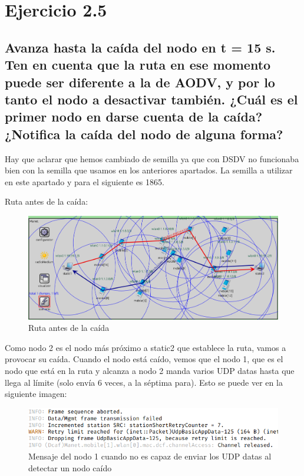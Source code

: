 \section{Ejercicio 2.5}

\subsection{Avanza hasta la caída del nodo en t = 15 s. Ten en cuenta que la ruta en ese momento puede ser diferente a
la de AODV, y por lo tanto el nodo a desactivar también. ¿Cuál es el primer nodo en darse cuenta de la caída?
¿Notifica la caída del nodo de alguna forma?}

Hay que aclarar que hemos cambiado de semilla ya que con DSDV no funcionaba bien con la semilla que usamos en los anteriores apartados. La semilla a utilizar en este apartado y para el siguiente es 1865.

Ruta antes de la caída:

\begin{figure}[H]
    \centering
    \includegraphics[width=115mm, scale=0.75]{imaxes/dsdv/ejercicio2_5.png}
    \caption{Ruta antes de la caída}
    \label{fig:ejer2_5_1}
\end{figure}


Como nodo 2 es el nodo más próximo a static2 que establece la ruta, vamos a provocar su caída. Cuando el nodo está caído, vemos que el nodo 1, que es el nodo que está en la ruta y alcanza a nodo 2 manda varios UDP datas hasta que llega al límite (solo envía 6 veces, a la séptima para). Esto se puede ver en la siguiente imagen:

\begin{figure}[H]
    \centering
    \includegraphics[width=115mm, scale=0.75]{imaxes/dsdv/ejercicio2_5_1.png}
    \caption{Mensaje del nodo 1 cuando no es capaz de enviar los UDP datas al detectar un nodo caído}
    \label{fig:ejer2_5_2}
\end{figure}


